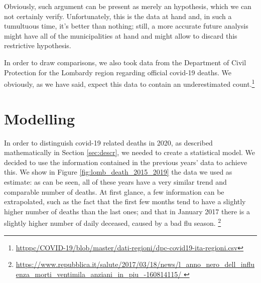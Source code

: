 \documentclass[11pt,a4paper,final]{paper}
\begin{document}
Obviously, such argument can be present as merely an hypothesis, which we can not certainly verify. Unfortunately, this is the data at hand and, in such a tumultuous time, it's better than nothing; still, a more accurate future analysis might have all of the municipalities at hand and might allow to discard this restrictive hypothesis.  

In order to draw comparisons, we also took data from the Department of Civil Protection for the Lombardy region regarding official covid-19 deaths. We obviously, as we have said, expect this data to contain an underestimated count.\footnote{\url{httppc/COVID-19/blob/master/dati-regioni/dpc-covid19-ita-regioni.csv}}


\section{Modelling}\label{sec:mod}

In order to distinguish covid-19 related deaths in 2020, as described mathematically in Section \ref{sec:descr}, we needed to create a statistical model. We decided to use the information contained in the previous years' data to achieve this. We show in Figure \ref{fig:lomb_death_2015_2019} the data we used as estimate: as can be seen, all of these years have a very similar trend and comparable number of deaths. At first glance, a few information can be extrapolated, such as the fact that the first few months tend to have a slightly higher number of deaths than the last ones; and that in January 2017 there is a slightly higher number of daily deceased, caused by a bad flu season. \footnote{\url{https://www.repubblica.it/salute/2017/03/18/news/l_anno_nero_dell_influenza_morti_ventimila_anziani_in_piu_-160814115/ }}
\end{document}

